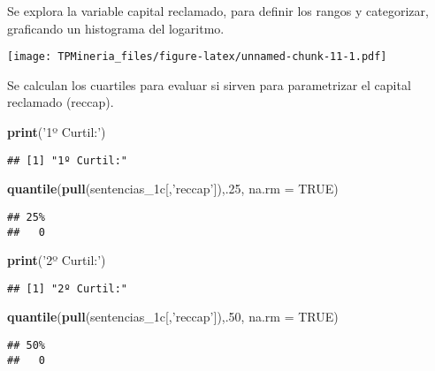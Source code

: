 \documentclass[runningheads,a4paper]{llncs}
\newenvironment{Shaded}{}{}
\newcommand{\KeywordTok}[1]{\textcolor[rgb]{0.00,0.44,0.13}{\textbf{{#1}}}}
\newcommand{\DataTypeTok}[1]{\textcolor[rgb]{0.56,0.13,0.00}{{#1}}}
\newcommand{\DecValTok}[1]{\textcolor[rgb]{0.25,0.63,0.44}{{#1}}}
\newcommand{\StringTok}[1]{\textcolor[rgb]{0.25,0.44,0.63}{{#1}}}
\newcommand{\OtherTok}[1]{\textcolor[rgb]{0.00,0.44,0.13}{{#1}}}
\newcommand{\NormalTok}[1]{{#1}}
\begin{document}
Se explora la variable capital reclamado, para definir los rangos y
categorizar, graficando un histograma del logaritmo.

\texttt{[image: TPMineria\_files/figure-latex/unnamed-chunk-11-1.pdf]}

Se calculan los cuartiles para evaluar si sirven para parametrizar el
capital reclamado (reccap).

\begin{Shaded}
\begin{Highlighting}[]
\KeywordTok{print}\NormalTok{(}\StringTok{'1º Curtil:'}\NormalTok{)}
\end{Highlighting}
\end{Shaded}

\begin{verbatim}
## [1] "1º Curtil:"
\end{verbatim}

\begin{Shaded}
\begin{Highlighting}[]
\KeywordTok{quantile}\NormalTok{(}\KeywordTok{pull}\NormalTok{(sentencias_1c[,}\StringTok{'reccap'}\NormalTok{]),.}\DecValTok{25}\NormalTok{, }\DataTypeTok{na.rm =} \OtherTok{TRUE}\NormalTok{)}
\end{Highlighting}
\end{Shaded}

\begin{verbatim}
## 25% 
##   0
\end{verbatim}

\begin{Shaded}
\begin{Highlighting}[]
\KeywordTok{print}\NormalTok{(}\StringTok{'2º Curtil:'}\NormalTok{)}
\end{Highlighting}
\end{Shaded}

\begin{verbatim}
## [1] "2º Curtil:"
\end{verbatim}

\begin{Shaded}
\begin{Highlighting}[]
\KeywordTok{quantile}\NormalTok{(}\KeywordTok{pull}\NormalTok{(sentencias_1c[,}\StringTok{'reccap'}\NormalTok{]),.}\DecValTok{50}\NormalTok{, }\DataTypeTok{na.rm =} \OtherTok{TRUE}\NormalTok{)}
\end{Highlighting}
\end{Shaded}

\begin{verbatim}
## 50% 
##   0
\end{verbatim}
\end{document}
